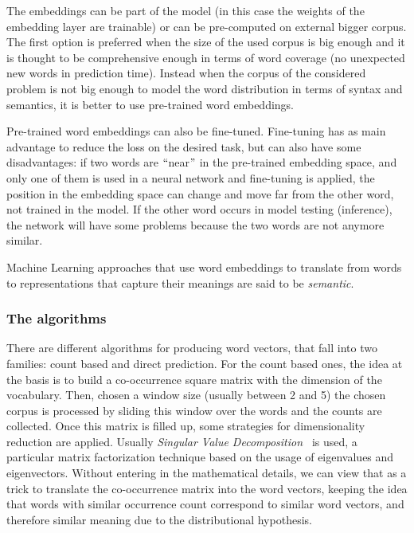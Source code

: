 The embeddings can be part of the model (in this case the weights of the embedding layer are trainable) or can be pre-computed on external bigger corpus. The first option is preferred when the size of the used corpus is big enough and it is thought to be comprehensive enough in terms of word coverage (no unexpected new words in prediction time). Instead when the corpus of the considered problem is not big enough to model the word distribution in terms of syntax and semantics, it is better to use pre-trained word embeddings.

Pre-trained word embeddings can also be fine-tuned. Fine-tuning has as main advantage to reduce the loss on the desired task, but can also have some disadvantages: if two words are $``$near$"$  in the pre-trained embedding space, and only one of them is used in a neural network and fine-tuning is applied, the position in the embedding space can change and move far from the other word, not trained in the model. If the other word occurs in model testing (inference), the network will have some problems because the two words are not anymore similar.

Machine Learning approaches that use word embeddings to translate from words to representations that capture their meanings are said to be \textit{semantic}.

\subsubsection{The algorithms}
There are different algorithms for producing word vectors, that fall into two families: count based and direct prediction. For the count based ones, the idea at the basis is to build a co-occurrence square matrix with the dimension of the vocabulary. Then, chosen a window size (usually between 2 and 5) the chosen corpus is processed by sliding this window over the words and the counts are collected. Once this matrix is filled up, some strategies for dimensionality reduction are applied. Usually \textit{Singular Value Decomposition~\cite{golub1970singular}} is used, a particular matrix factorization technique based on the usage of eigenvalues and eigenvectors. Without entering in the mathematical details, we can view that as a trick to translate the co-occurrence matrix into the word vectors, keeping the idea that words with similar occurrence count correspond to similar word vectors, and therefore similar meaning due to the distributional hypothesis.

